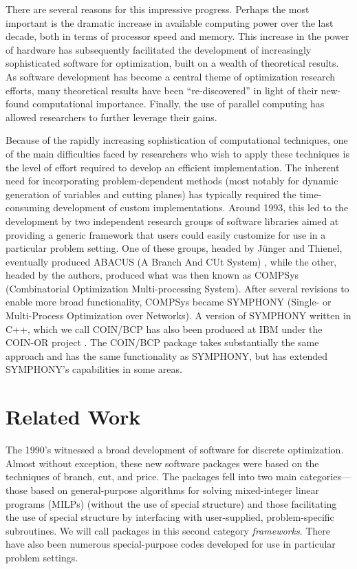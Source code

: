 There are several reasons for this impressive progress. Perhaps the
most important is the dramatic increase in available computing power
over the last decade, both in terms of processor speed and memory.
This increase in the power of hardware has subsequently facilitated
the development of increasingly sophisticated software for
optimization, built on a wealth of theoretical results. As software
development has become a central theme of optimization research
efforts, many theoretical results have been ``re-discovered'' in light
of their new-found computational importance. Finally, the use of
parallel computing has allowed researchers to further leverage their
gains.

Because of the rapidly increasing sophistication of computational
techniques, one of the main difficulties faced by researchers who wish
to apply these techniques is the level of effort required to develop
an efficient implementation. The inherent need for incorporating
problem-dependent methods (most notably for dynamic generation of
variables and cutting planes) has typically required the
time-consuming development of custom implementations. Around 1993,
this led to the development by two independent research groups of
software libraries aimed at providing a generic framework that users
could easily customize for use in a particular problem setting. One of
these groups, headed by J\"unger and Thienel, eventually produced
ABACUS (A Branch And CUt System) \cite{abacus1}, while the other,
headed by the authors, produced what was then known as COMPSys
(Combinatorial Optimization Multi-processing System). After several
revisions to enable more broad functionality, COMPSys became SYMPHONY
(Single- or Multi-Process Optimization over Networks). 
A version of SYMPHONY written in C++, which we call
COIN/BCP has also been produced at IBM under the COIN-OR project
\cite{coin-or}. The COIN/BCP package takes substantially the same
approach and has the same functionality as SYMPHONY, but has extended
SYMPHONY's capabilities in some areas.

\section{Related Work}
\label{related}

The 1990's witnessed a broad development of software for discrete
optimization. Almost without exception, these new software packages
were based on the techniques of branch, cut, and price. The packages
fell into two main categories---those based on general-purpose
algorithms for solving mixed-integer linear programs (MILPs)
(without the use of special structure)
and those facilitating the use of special structure by interfacing
with user-supplied, problem-specific subroutines. We will call
packages in this second category {\em frameworks}. There have also
been numerous special-purpose codes developed for use in particular
problem settings.

